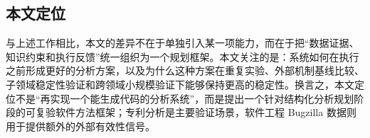 \subsection{本文定位}

与上述工作相比，本文的差异不在于单独引入某一项能力，而在于把“数据证据、知识约束和执行反馈”统一组织为一个规划框架。本文关注的是：系统如何在执行之前形成更好的分析方案，以及为什么这种方案在重复实验、外部机制基线比较、子领域稳定性验证和跨领域小规模验证下能够保持更高的稳定性。换言之，本文定位不是“再实现一个能生成代码的分析系统”，而是提出一个针对结构化分析规划阶段的可复验软件方法框架；专利分析是主要验证场景，软件工程 Bugzilla 数据则用于提供额外的外部有效性信号。
